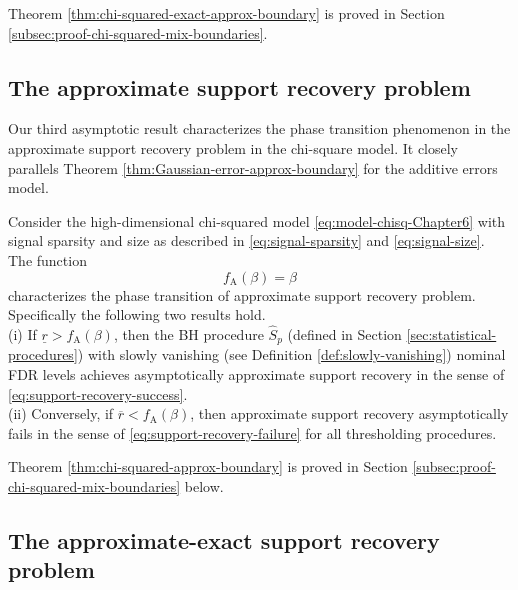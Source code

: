Theorem \ref{thm:chi-squared-exact-approx-boundary} is proved in Section \ref{subsec:proof-chi-squared-mix-boundaries}. 


\subsection{The approximate support recovery problem}
\label{subsec:approx-support-recovery-chisq}

Our third asymptotic result characterizes the phase transition phenomenon in the approximate support recovery problem in the chi-square model.
It closely parallels Theorem \ref{thm:Gaussian-error-approx-boundary} for the additive errors model.

\begin{theorem} \label{thm:chi-squared-approx-boundary}
Consider the high-dimensional chi-squared model \eqref{eq:model-chisq-Chapter6} with signal sparsity and size as described in \eqref{eq:signal-sparsity} and \eqref{eq:signal-size}.
The function 
\begin{equation} \label{eq:approx-boundary-chisquared}
    f_{\mathrm{A}}(\beta) = \beta
\end{equation}
characterizes the phase transition of approximate support recovery problem. Specifically the following two results hold.\\

{\rm (i)} If $\underline{r} > f_{\mathrm{A}}(\beta)$, then the \ac{BH} procedure $\widehat{S}_p$ (defined in Section \ref{sec:statistical-procedures}) with slowly vanishing (see Definition \ref{def:slowly-vanishing}) nominal FDR levels achieves asymptotically approximate support recovery in the sense of \eqref{eq:support-recovery-success}. \\

{\rm (ii)} Conversely, if $\overline{r} < f_{\mathrm{A}}(\beta)$, then approximate support recovery asymptotically fails in the sense of \eqref{eq:support-recovery-failure} for all thresholding procedures.
\end{theorem}

Theorem \ref{thm:chi-squared-approx-boundary} is proved in Section \ref{subsec:proof-chi-squared-mix-boundaries} below. 


\subsection{The approximate-exact support recovery problem}
\label{subsec:aprox-exact-support-recovery-chisq}

